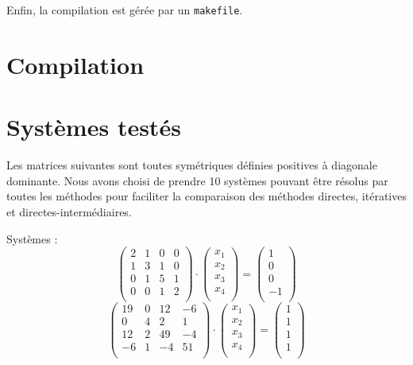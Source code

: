 \documentclass{report}
\begin{document}
	Enfin, la compilation est gérée par un \verb"makefile".  
	\section{Compilation}
	
	\newpage
	\section{Systèmes testés}
	  Les matrices suivantes sont toutes symétriques définies positives à diagonale dominante. Nous avons choisi de prendre 10 systèmes pouvant être résolus par toutes les méthodes pour faciliter la comparaison des méthodes directes, itératives et directes-intermédiaires.
	  \vspace{0.5cm}
	  
	          Systèmes :
        \begin{equation}
        \begin{pmatrix}
		2 & 1 & 0 & 0 \\
		1 & 3 & 1 & 0 \\
		0 & 1 & 5 & 1 \\
		0 & 0 & 1 & 2 \\
        \end{pmatrix}
        \cdot
        \begin{pmatrix}
          x_1 \\
          x_2 \\
          x_3 \\
          x_4 \\
        \end{pmatrix}
        =
        \begin{pmatrix}
		1 \\
		0 \\
		0 \\
		-1 \\
        \end{pmatrix}
        \label{syst1} %
        \end{equation}
        \begin{equation}
        \begin{pmatrix}
		19 & 0 & 12 & -6 \\
		0 & 4 & 2 & 1 \\
		12 & 2 & 49 & -4 \\
		-6 & 1 & -4 & 51 \\
        \end{pmatrix}
        \cdot
        \begin{pmatrix}
          x_1 \\
          x_2 \\
          x_3 \\
          x_4 \\
        \end{pmatrix}
        =
        \begin{pmatrix}
		1 \\
		1 \\
		1 \\
		1 \\
        \end{pmatrix}
        \label{syst2}
        \end{equation}
\end{document}
